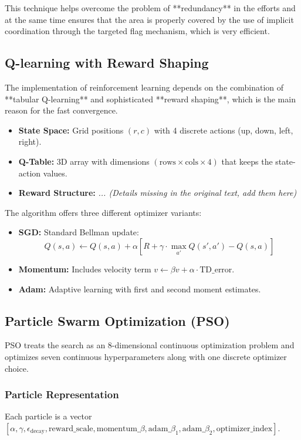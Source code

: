 \documentclass[12pt,a4paper]{report}
\begin{document}
\begin{itemize}
\begin{itemize}
\begin{itemize}
\begin{itemize}
This technique helps overcome the problem of **redundancy** in the efforts and at the same time ensures that the area is properly covered by the use of implicit coordination through the targeted flag mechanism, which is very efficient.

\subsection*{Q-learning with Reward Shaping}

The implementation of reinforcement learning depends on the combination of **tabular Q-learning** and sophisticated **reward shaping**, which is the main reason for the fast convergence.

\begin{itemize}
    \item \textbf{State Space:} Grid positions $(r, c)$ with 4 discrete actions (up, down, left, right).
    \item \textbf{Q-Table:} 3D array with dimensions $(\text{rows} \times \text{cols} \times 4)$ that keeps the state-action values.
    \item \textbf{Reward Structure:} \textit{... (Details missing in the original text, add them here)}
\end{itemize}

The algorithm offers three different optimizer variants:

\begin{itemize}
    \item \textbf{SGD:} Standard Bellman update:
    $$Q(s,a) \leftarrow Q(s,a) + \alpha\left[R + \gamma \cdot \max_{a'} Q(s',a') - Q(s,a)\right]$$
    \item \textbf{Momentum:} Includes velocity term $v \leftarrow \beta v + \alpha \cdot \text{TD\_error}$.
    \item \textbf{Adam:} Adaptive learning with first and second moment estimates.
\end{itemize}

\subsection*{Particle Swarm Optimization (PSO)}

PSO treats the search as an 8-dimensional continuous optimization problem and optimizes seven continuous hyperparameters along with one discrete optimizer choice. 

\subsubsection*{Particle Representation}
Each particle is a vector $[\alpha, \gamma, \epsilon_{\text{decay}}, \text{reward\_scale}, \text{momentum\_}\beta, \text{adam\_}\beta_1, \text{adam\_}\beta_2, \text{optimizer\_index}]$.


\end{itemize}
\end{itemize}
\end{itemize}
\end{itemize}
\end{document}
